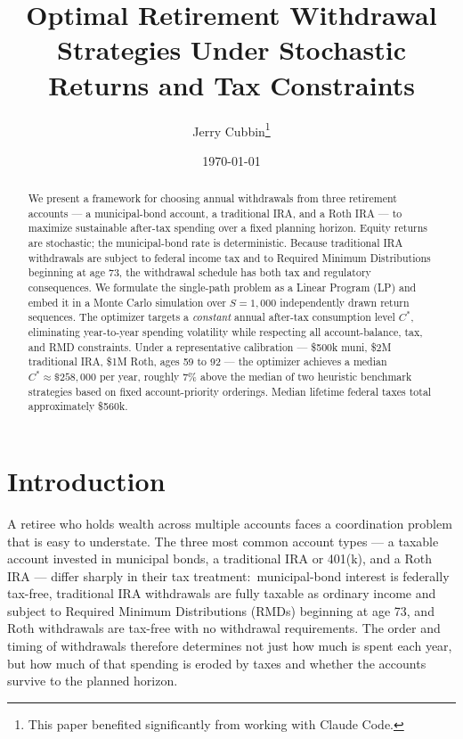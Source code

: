 \documentclass[12pt]{article}
\title{\textbf{Optimal Retirement Withdrawal Strategies Under Stochastic Returns and Tax Constraints}}
\author{Jerry Cubbin\footnote{This paper benefited significantly from working with Claude Code.}}
\date{\today}
\newcommand{\Copt}{C^{*}}
\begin{document}
\maketitle
\thispagestyle{empty}

\begin{abstract}
We present a framework for choosing annual withdrawals from three retirement
accounts --- a municipal-bond account, a traditional IRA, and a Roth IRA ---
to maximize sustainable after-tax spending over a fixed planning horizon.
Equity returns are stochastic; the municipal-bond rate is deterministic.
Because traditional IRA withdrawals are subject to federal income tax and to
Required Minimum Distributions beginning at age 73, the withdrawal schedule
has both tax and regulatory consequences.
We formulate the single-path problem as a Linear Program (LP) and embed it in a
Monte Carlo simulation over $S = 1{,}000$ independently drawn return sequences.
The optimizer targets a \emph{constant} annual after-tax consumption level
$\Copt$, eliminating year-to-year spending volatility while respecting all
account-balance, tax, and RMD constraints.
Under a representative calibration --- \$500k muni, \$2M traditional IRA,
\$1M Roth, ages 59 to 92 --- the optimizer achieves a median
$\Copt \approx \$258{,}000$ per year, roughly 7\% above the median of two
heuristic benchmark strategies based on fixed account-priority orderings.
Median lifetime federal taxes total approximately \$560k.
\end{abstract}

\newpage
\tableofcontents
\newpage

\section{Introduction}
\label{sec:intro}

A retiree who holds wealth across multiple accounts faces a coordination
problem that is easy to understate. The three most common account types ---
a taxable account invested in municipal bonds, a traditional IRA or 401(k),
and a Roth IRA --- differ sharply in their tax treatment:\ municipal-bond
interest is federally tax-free, traditional IRA withdrawals are fully taxable
as ordinary income and subject to Required Minimum Distributions (RMDs)
beginning at age 73, and Roth withdrawals are tax-free with no withdrawal
requirements. The order and timing of withdrawals therefore determines not just
how much is spent each year, but how much of that spending is eroded by taxes
and whether the accounts survive to the planned horizon.
\end{document}
